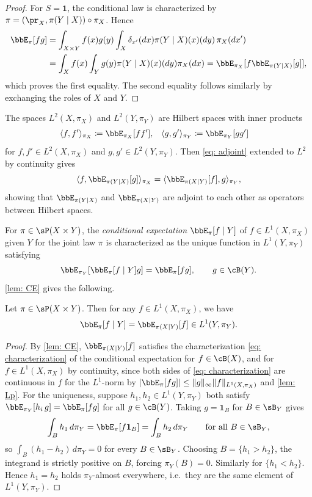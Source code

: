 \documentclass[12pt,reqno]{amsart}%
\theoremstyle{plain}
\theoremstyle{definition}
\def\pair#1{\langle#1\rangle}
\def\abs#1{|#1|}
\def\dabs#1{\Vert#1\Vert}
\def\bsone{\boldsymbol{1}}
\def\one{\boldsymbol{1}}
\begin{document}
\begin{proof}
	For $S=\bsone$, the conditional law is characterized by
	$\pi=(\pr_X,\pi(Y\mid X))\circ\pi_X$.
	Hence
	\begin{align*}
		\bbE_\pi[fg]&=\int_{X\times Y}f(x)g(y)\int_X\delta_{x'}(dx)\pi(Y\mid X)(x)(dy)\,\pi_X(dx')\\
		&=\int_{X}f(x)\int_Y g(y)\pi(Y\mid X)(x)(dy)\pi_X(dx)=\bbE_{\pi_X}[f\bbE_{\pi(Y\mid X)}[g]],
	\end{align*}
	which proves the first equality.
	The second equality follows similarly by exchanging the roles of $X$ and $Y$.
\end{proof}

The spaces $L^2(X,\pi_X)$ and $L^2(Y,\pi_Y)$ are Hilbert spaces
with inner products
\begin{align*}
	\pair{f,f'}_{\pi_X}&\coloneqq\bbE_{\pi_X}[ff'],&
	\pair{g,g'}_{\pi_Y}&\coloneqq\bbE_{\pi_Y}[gg']
\end{align*}
for $f,f'\in L^2(X,\pi_X)$ and $g,g'\in L^2(Y,\pi_Y)$.  Then \eqref{eq: adjoint} extended to $L^2$ by continuity gives
\[
		\pair{f , \bbE_{\pi(Y\mid X)}[g]}_{\pi_X} =
		\pair{\bbE_{\pi(X\mid Y)}[f] ,g}_{\pi_Y},
\]
showing that $\bbE_{\pi(Y\mid X)}$ and $\bbE_{\pi(X\mid Y)}$ are adjoint to each other as
operators between Hilbert spaces.

For $\pi\in\sP(X\times Y)$, the \emph{conditional expectation}  $\bbE_\pi[f\mid Y]$ of $f\in L^1(X,\pi_X)$
given $Y$ for the joint law $\pi$ is characterized as the unique function in $L^1(Y,\pi_Y)$ satisfying
\begin{equation}\label{eq: characterization}
	\bbE_{\pi_Y}[\bbE_\pi[f\mid Y]g]=\bbE_\pi[fg],\qquad g\in\cB(Y).
\end{equation}
\cref{lem: CE} gives the following.

\begin{lemma}\label{lem: CE CL}
	Let $\pi\in\sP(X\times Y)$.
	Then for any $f\in L^1(X,\pi_X)$, we have
	\[
		\bbE_\pi[f\mid Y]=\bbE_{\pi(X\mid Y)}[f]\in L^1(Y,\pi_Y).
	\]
\end{lemma}

\begin{proof}
	By \cref{lem: CE}, $\bbE_{\pi(X\mid Y)}[f]$ satisfies the characterization \eqref{eq: characterization} of the
	conditional expectation for $f\in\cB(X)$, and for $f\in L^1(X,\pi_X)$ by continuity,
	since both sides of \eqref{eq: characterization} are continuous in $f$ for the $L^1$-norm
	by $\abs{\bbE_\pi[fg]}\leq\dabs{g}_\infty\dabs{f}_{L^1(X,\pi_X)}$ and \cref{lem: Lp}.
	For the uniqueness, suppose $h_1,h_2\in L^1(Y,\pi_Y)$ both satisfy $\bbE_{\pi_Y}[h_i\,g]=\bbE_\pi[fg]$ for all $g\in\cB(Y)$. Taking $g=\one_B$ for $B\in\sB_Y$ gives
\[
	\int_Bh_1\,d\pi_Y=\bbE_\pi[f\one_B]=\int_Bh_2\,d\pi_Y\qquad\text{for all }B\in\sB_Y,
\]
so $\int_B(h_1-h_2)\,d\pi_Y=0$ for every $B\in\sB_Y$. Choosing $B=\{h_1>h_2\}$, the integrand is strictly positive on $B$, forcing $\pi_Y(B)=0$.  Similarly for $\{h_1<h_2\}$. Hence $h_1=h_2$ holds $\pi_Y$-almost everywhere, i.e.\ they are the same element of $L^1(Y,\pi_Y)$.
\end{proof}
\end{document}
